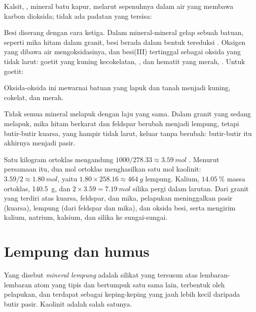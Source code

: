 \begin{proposition}\label{prop:g10:soil-formation:calcite}
Kalsit, , mineral batu kapur, melarut sepenuhnya dalam air yang
membawa karbon dioksida; tidak ada padatan yang tersisa:
\begin{center}
\end{center}
\end{proposition}

Besi diserang dengan cara ketiga. Dalam mineral-mineral gelap sebuah batuan,
seperti mika hitam dalam granit, besi berada dalam bentuk tereduksi
. Oksigen yang dibawa air mengoksidasinya, dan besi(III) tertinggal
sebagai oksida yang tidak larut: goetit yang kuning kecokelatan,
, dan hematit yang merah, . Untuk goetit:
\begin{center}
\end{center}
Oksida-oksida ini mewarnai batuan yang lapuk dan tanah menjadi kuning, cokelat, dan merah.

Tidak semua mineral melapuk dengan laju yang sama. Dalam granit yang sedang
melapuk, mika hitam berkarat dan feldspar berubah menjadi lempung, tetapi
butir-butir kuarsa, yang hampir tidak larut, keluar tanpa berubah: butir-butir
itu akhirnya menjadi pasir.

\begin{example}\label{ex:g10:soil-formation:granite}
Satu kilogram ortoklas mengandung $1000/278.33 \approx \qty{3.59}{mol}$
. Menurut persamaan itu, dua mol ortoklas menghasilkan satu mol
kaolinit: $3.59/2 \approx \qty{1.80}{mol}$, yaitu $1.80 \times 258.16
\approx \qty{464}{g}$ lempung. Kalium, $14.05~\%$ massa ortoklas,
\qty{140.5}{g}, dan $2 \times 3.59 = \qty{7.19}{mol}$ silika pergi dalam
larutan. Dari granit yang terdiri atas kuarsa, feldspar, dan mika, pelapukan
meninggalkan pasir (kuarsa), lempung (dari feldspar dan mika), dan oksida
besi, serta mengirim kalium, natrium, kalsium, dan silika ke sungai-sungai.
\end{example}

\section{Lempung dan humus}

\begin{definition}\label{def:g10:soil-formation:clay}
Yang disebut \emph{mineral lempung} adalah silikat yang
tersusun atas lembaran-lembaran atom yang tipis dan bertumpuk satu sama lain,
terbentuk oleh pelapukan, dan terdapat sebagai keping-keping yang jauh lebih
kecil daripada butir pasir. Kaolinit adalah salah satunya.
\end{definition}

